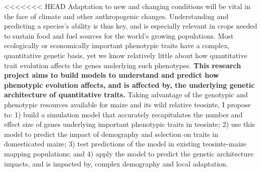 <<<<<<< HEAD
Adaptation to new and changing conditions will be vital in the face of climate and other anthropogenic changes. Understanding and predicting a species's ability is thus key, and is especially relevant in crops needed to sustain food and fuel sources for the world's growing populations.  Most ecologically or economically important phenotypic traits have a complex, quantitative genetic basis, yet we know relatively little about how quantitative trait evolution affects the genes underlying such phenotypes. \textbf{This research project aims to build models to understand and predict how phenotypic evolution affects, and is affected by, the underlying genetic architecture of quantitative traits.}  
Taking advantage of the genotypic and phenotypic resources available for maize and its wild relative teosinte, I propose to: 1) build a simulation model that accurately recapitulates the number and effect size of genes underlying important phenotypic traits in teosinte; 2) use this model to predict the impact of demography and selection on traits in domesticated maize; 3) test predictions of the model in existing teosinte-maize mapping populations; and 4) apply the model to predict the genetic architecture impacts, and is impacted by, complex demography and local adaptation.
